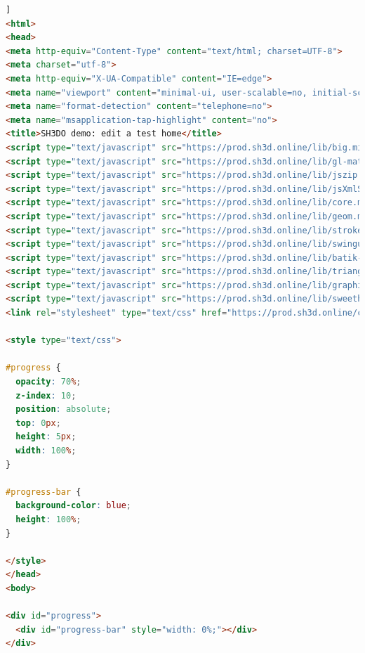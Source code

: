\documentclass[a4paper]{report}
\begin{document}
\begin{lstlisting}[language=html,caption={Basic example},captionpos=b,label={lst:basic-example}]]
<html>
<head>
<meta http-equiv="Content-Type" content="text/html; charset=UTF-8">
<meta charset="utf-8">
<meta http-equiv="X-UA-Compatible" content="IE=edge">
<meta name="viewport" content="minimal-ui, user-scalable=no, initial-scale=1, maximum-scale=1, minimum-scale=1, width=device-width">
<meta name="format-detection" content="telephone=no">
<meta name="msapplication-tap-highlight" content="no">
<title>SH3DO demo: edit a test home</title>
<script type="text/javascript" src="https://prod.sh3d.online/lib/big.min.js" crossorigin="anonymous"></script>
<script type="text/javascript" src="https://prod.sh3d.online/lib/gl-matrix-min.js" crossorigin="anonymous"></script>
<script type="text/javascript" src="https://prod.sh3d.online/lib/jszip.min.js" crossorigin="anonymous"></script>
<script type="text/javascript" src="https://prod.sh3d.online/lib/jsXmlSaxParser.min.js" crossorigin="anonymous"></script>
<script type="text/javascript" src="https://prod.sh3d.online/lib/core.min.js" crossorigin="anonymous"></script>
<script type="text/javascript" src="https://prod.sh3d.online/lib/geom.min.js" crossorigin="anonymous"></script>
<script type="text/javascript" src="https://prod.sh3d.online/lib/stroke.min.js" crossorigin="anonymous"></script>
<script type="text/javascript" src="https://prod.sh3d.online/lib/swingundo.min.js" crossorigin="anonymous"></script>
<script type="text/javascript" src="https://prod.sh3d.online/lib/batik-svgpathparser.min.js" crossorigin="anonymous"></script>
<script type="text/javascript" src="https://prod.sh3d.online/lib/triangulator.min.js" crossorigin="anonymous"></script>
<script type="text/javascript" src="https://prod.sh3d.online/lib/graphics2d.min.js" crossorigin="anonymous"></script>
<script type="text/javascript" src="https://prod.sh3d.online/lib/sweethome3d.min.js" crossorigin="anonymous"></script>
<link rel="stylesheet" type="text/css" href="https://prod.sh3d.online/css/sweethome3d.css" crossorigin="anonymous">

<style type="text/css">

#progress {
  opacity: 70%;
  z-index: 10;
  position: absolute;
  top: 0px;
  height: 5px;
  width: 100%;
}

#progress-bar {
  background-color: blue;
  height: 100%;
}

</style>
</head>
<body>

<div id="progress">
  <div id="progress-bar" style="width: 0%;"></div>
</div>


\end{lstlisting}
\end{document}
